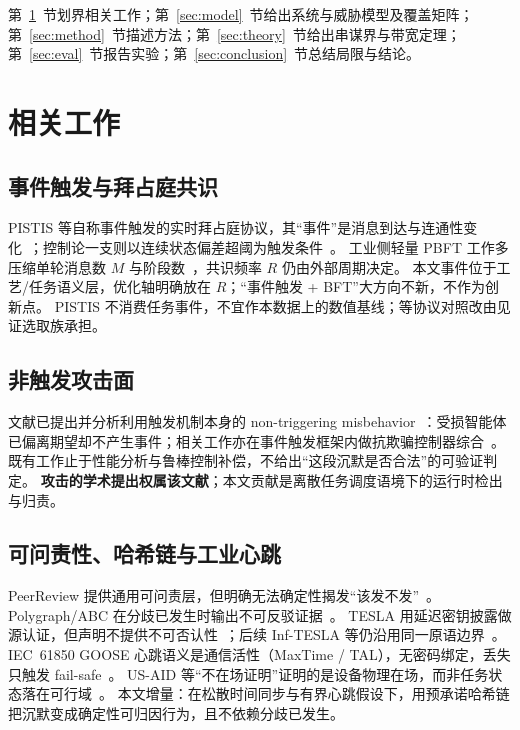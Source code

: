 \documentclass[manuscript,screen,review]{acmart}
\begin{document}
第~\ref{sec:related}~节划界相关工作；第~\ref{sec:model}~节给出系统与威胁模型及覆盖矩阵；第~\ref{sec:method}~节描述方法；第~\ref{sec:theory}~节给出串谋界与带宽定理；第~\ref{sec:eval}~节报告实验；第~\ref{sec:conclusion}~节总结局限与结论。

\section{相关工作}
\label{sec:related}

\subsection{事件触发与拜占庭共识}

PISTIS 等自称事件触发的实时拜占庭协议，其``事件''是消息到达与连通性变化~\cite{pistis2021}；控制论一支则以连续状态偏差超阈为触发条件~\cite{tac2025el,hdetm2024}。
工业侧轻量 PBFT 工作多压缩单轮消息数 $M$ 与阶段数~\cite{ccgridw2023pbft,sensors2024aloha}，共识频率 $R$ 仍由外部周期决定。
本文事件位于工艺/任务语义层，优化轴明确放在 $R$；``事件触发 + BFT''大方向不新，不作为创新点。
PISTIS 不消费任务事件，不宜作本数据上的数值基线；等协议对照改由见证选取族承担。

\subsection{非触发攻击面}

文献已提出并分析利用触发机制本身的 non-triggering misbehavior~\cite{nontrigger2022}：受损智能体已偏离期望却不产生事件；相关工作亦在事件触发框架内做抗欺骗控制器综合~\cite{asjc2023contain,ijrnc2023deception}。
既有工作止于性能分析与鲁棒控制补偿，不给出``这段沉默是否合法''的可验证判定。
\textbf{攻击的学术提出权属该文献}；本文贡献是离散任务调度语境下的运行时检出与归责。

\subsection{可问责性、哈希链与工业心跳}

PeerReview 提供通用可问责层，但明确无法确定性揭发``该发不发''~\cite{peerreview2007}。
Polygraph/ABC 在分歧已发生时输出不可反驳证据~\cite{polygraph2021,abc2023}。
TESLA 用延迟密钥披露做源认证，但声明不提供不可否认性~\cite{tesla2001,rfc4082}；后续 Inf-TESLA 等仍沿用同一原语边界~\cite{inftesla2022}。
IEC~61850 GOOSE 心跳语义是通信活性（MaxTime / TAL），无密码绑定，丢失只触发 fail-safe~\cite{goose615}。
US-AID 等``不在场证明''证明的是设备物理在场，而非任务状态落在可行域~\cite{usaid}。
本文增量：在松散时间同步与有界心跳假设下，用预承诺哈希链把沉默变成确定性可归因行为，且不依赖分歧已发生。
\end{document}
